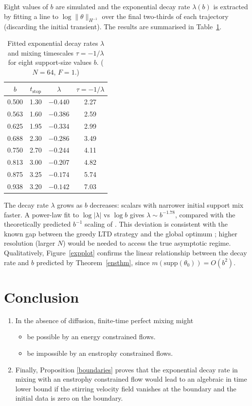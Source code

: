 \documentclass[12pt]{report}   %
\numberwithin{equation}{section}
\theoremstyle{plain}
\theoremstyle{definition}
\theoremstyle{remark}
\begin{document}
Eight values of $b$ are simulated and the exponential decay rate $\lambda(b)$ is extracted by fitting a line to $\log\|\theta\|_{H^{-1}}$ over the final two-thirds of each trajectory (discarding the initial transient). The results are summarised in Table~\ref{tab:decayrates}.

\begin{table}[H]
  \centering
  \caption{Fitted exponential decay rates $\lambda$ and mixing timescales $\tau = -1/\lambda$ for eight support-size values $b$. ($N = 64$, $F = 1$.)}
  \label{tab:decayrates}
  \begin{tabular}{cccc}
    \toprule
    $b$ & $t_{\text{stop}}$ & $\lambda$ & $\tau = -1/\lambda$ \\
    \midrule
    0.500 & 1.30 & $-0.440$ & 2.27 \\
    0.563 & 1.60 & $-0.386$ & 2.59 \\
    0.625 & 1.95 & $-0.334$ & 2.99 \\
    0.688 & 2.30 & $-0.286$ & 3.49 \\
    0.750 & 2.70 & $-0.244$ & 4.11 \\
    0.813 & 3.00 & $-0.207$ & 4.82 \\
    0.875 & 3.25 & $-0.174$ & 5.74 \\
    0.938 & 3.20 & $-0.142$ & 7.03 \\
    \bottomrule
  \end{tabular}
\end{table}

The decay rate $\lambda$ grows as $b$ decreases: scalars with narrower initial support mix faster. A power-law fit to $\log|\lambda|$ vs $\log b$ gives $\lambda \sim b^{-1.78}$, compared with the theoretically predicted $b^{-1}$ scaling of \cite{opt}. This deviation is consistent with the known gap between the greedy LTD strategy and the global optimum \cite{IyerKiselevEA14}; higher resolution (larger $N$) would be needed to access the true asymptotic regime. Qualitatively, Figure~\ref{expplot} confirms the linear relationship between the decay rate and $b$ predicted by Theorem~\ref{ensthm}, since $m(\mathrm{supp}(\theta_0)) = O(b^2)$.
 
 \section{ Conclusion}
  \begin{enumerate}
\item In the absence of diffusion, finite-time perfect mixing  might 
\begin{itemize}
    \item be possible by an energy constrained flows.
    \item be impossible by an enstrophy constrained flows.
\end{itemize}
 \vspace{0.2cm} 
 \item Finally, Proposition \ref{boundaries} proves that the exponential
  decay rate in mixing with an enstrophy constrained flow would lead to an
  algebraic in time lower bound if the stirring velocity field vanishes at the
  boundary and the initial data is zero on the boundary.
 \end{enumerate} 
\end{document}
